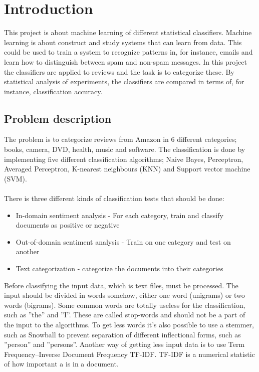 \chapter{Introduction}
This project is about machine learning of different statistical classifiers.
Machine learning is about construct and study systems that can learn from data.
This could be used to train a system to recognize patterns in, for instance, emails and learn how to distinguish between spam and non-spam messages. In this project the classifiers are applied to reviews and the task is to categorize these.
By statistical analysis of experiments, the classifiers are compared in terms of, for instance, classification accuracy.

\section{Problem description}
The problem is to categorize reviews from Amazon in 6 different categories; books, camera, DVD, health, music and software.
The classification is done by implementing five different classification algorithms; Naive Bayes, Perceptron, Averaged Perceptron, K-nearest neighbours (KNN) and Support vector machine (SVM). \\\\
There is three different kinds of classification tests that should be done: 
\begin{itemize}
\item In-domain sentiment analysis - For each category, train and classify documents as positive or negative
\item Out-of-domain sentiment analysis - Train on one category and test on another
\item Text categorization - categorize the documents into their categories
\end{itemize}
Before classifying the input data, which is text files, must be processed.
The input should be divided in words somehow, either one word (unigrams) or two words (bigrams). Some common words are totally useless for the classification, such as ''the'' and ''I''. These are called stop-words and should not be a part of the input to the algorithms. To get less words it's also possible to use a stemmer, such as Snowball to prevent separation of different inflectional forms, such as ''person'' and ''persons''. Another way of getting less input data is to use Term Frequency–Inverse Document Frequency TF-IDF. TF-IDF is a numerical statistic of how important a is in a document.

